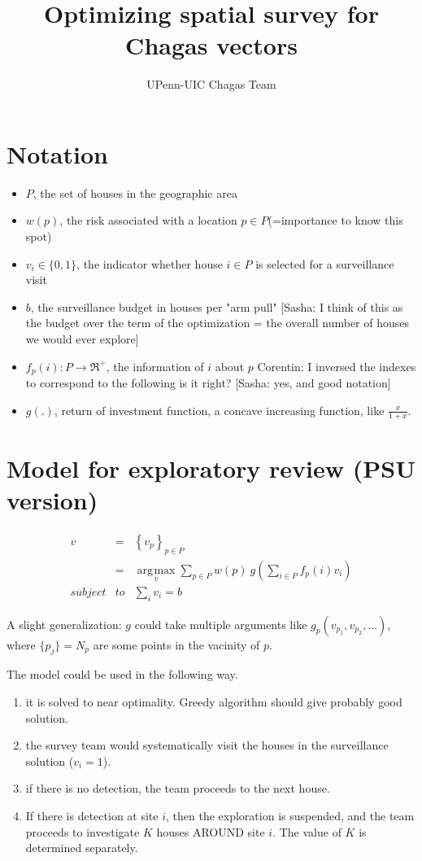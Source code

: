 \documentclass{article}
\title{Optimizing spatial survey for Chagas vectors}
\author{UPenn-UIC Chagas Team}
\date{}
\DeclareMathOperator*{\argmax}{\arg\!\max}
\begin{document}
\maketitle
\section{Notation}
\begin{itemize}
\item $P$, the set of houses in the geographic area
\item $w(p)$, the risk associated with a location $p\in P$(=importance to know this spot)
\item $v_i \in \{0,1\}$, the indicator whether house $i \in P$ is selected for a surveillance visit
\item $b$, the surveillance budget in houses per "arm pull" [Sasha: I think of this as the budget over the term of the optimization = the overall number of houses we would ever explore]
\item $f_p(i): P \to \Re^+$, the information of $i$ about $p$ \newline
Corentin: I inversed the indexes to correspond to the following is it right? [Sasha: yes, and good notation]
\item $g(.)$, return of investment function, a concave increasing function, like $\frac{x}{1+x}$.
\end{itemize}

\section{Model for exploratory review (PSU version)}

\begin{eqnarray}
v &=& \left\{v_p\right\}_{p\in P}\\
&=& \underset{v}{\argmax} \sum_{p \in P} w(p) ~g\left (\sum_{i \in P} f_p(i) v_i \right ) \\
subject &to& \sum_i{v_i} = b
\end{eqnarray}

A slight generalization:  $g$ could take multiple arguments like $g_p(v_{p_1}, v_{p_2}, \dots)$, where $\{p_j\} = N_p$ are some points in the vacinity of $p$.


The model could be used in the following way.  
\begin{enumerate}
\item it is solved to near optimality.  Greedy algorithm should give probably good solution.
\item the survey team would systematically visit the houses in the surveillance solution ($v_i=1$).  
\item if there is no detection, the team proceeds to the next house.  
\item If there is detection at site $i$, then the exploration is suspended, and the team proceeds to investigate $K$ houses AROUND site $i$.  The value of $K$ is determined separately.
\end{enumerate}
\end{document}
